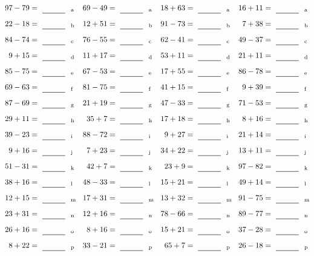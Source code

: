 \documentclass
[
  draft    = true,
  fontsize = 11pt,
  parskip  = half-
]
{scrartcl}
\begin{document}
\clearpage
\begin{align*}
    \pline{97-79}&=\rline{a}
  & \pline{69-49}&=\rline{a}
  & \pline{18+63}&=\rline{a}
  & \pline{16+11}&=\rline{a} \\[1ex]
    \pline{22-18}&=\rline{b}
  & \pline{12+51}&=\rline{b}
  & \pline{91-73}&=\rline{b}
  & \pline{7+38}&=\rline{b} \\[1ex]
    \pline{84-74}&=\rline{c}
  & \pline{76-55}&=\rline{c}
  & \pline{62-41}&=\rline{c}
  & \pline{49-37}&=\rline{c} \\[1ex]
    \pline{9+15}&=\rline{d}
  & \pline{11+17}&=\rline{d}
  & \pline{53+11}&=\rline{d}
  & \pline{21+11}&=\rline{d} \\[1ex]
    \pline{85-75}&=\rline{e}
  & \pline{67-53}&=\rline{e}
  & \pline{17+55}&=\rline{e}
  & \pline{86-78}&=\rline{e} \\[1ex]
    \pline{69-63}&=\rline{f}
  & \pline{81-75}&=\rline{f}
  & \pline{41+15}&=\rline{f}
  & \pline{9+39}&=\rline{f} \\[1ex]
    \pline{87-69}&=\rline{g}
  & \pline{21+19}&=\rline{g}
  & \pline{47-33}&=\rline{g}
  & \pline{71-53}&=\rline{g} \\[1ex]
    \pline{29+11}&=\rline{h}
  & \pline{35+7}&=\rline{h}
  & \pline{17+18}&=\rline{h}
  & \pline{8+16}&=\rline{h} \\[1ex]
    \pline{39-23}&=\rline{i}
  & \pline{88-72}&=\rline{i}
  & \pline{9+27}&=\rline{i}
  & \pline{21+14}&=\rline{i} \\[1ex]
    \pline{9+16}&=\rline{j}
  & \pline{7+23}&=\rline{j}
  & \pline{34+22}&=\rline{j}
  & \pline{13+11}&=\rline{j} \\[1ex]
    \pline{51-31}&=\rline{k}
  & \pline{42+7}&=\rline{k}
  & \pline{23+9}&=\rline{k}
  & \pline{97-82}&=\rline{k} \\[1ex]
    \pline{38+16}&=\rline{l}
  & \pline{48-33}&=\rline{l}
  & \pline{15+21}&=\rline{l}
  & \pline{49+14}&=\rline{l} \\[1ex]
    \pline{12+15}&=\rline{m}
  & \pline{17+31}&=\rline{m}
  & \pline{13+32}&=\rline{m}
  & \pline{91-75}&=\rline{m} \\[1ex]
    \pline{23+31}&=\rline{n}
  & \pline{12+16}&=\rline{n}
  & \pline{78-66}&=\rline{n}
  & \pline{89-77}&=\rline{n} \\[1ex]
    \pline{26+16}&=\rline{o}
  & \pline{8+16}&=\rline{o}
  & \pline{15+21}&=\rline{o}
  & \pline{37-28}&=\rline{o} \\[1ex]
    \pline{8+22}&=\rline{p}
  & \pline{33-21}&=\rline{p}
  & \pline{65+7}&=\rline{p}
  & \pline{26-18}&=\rline{p}
\end{align*}
\end{document}
